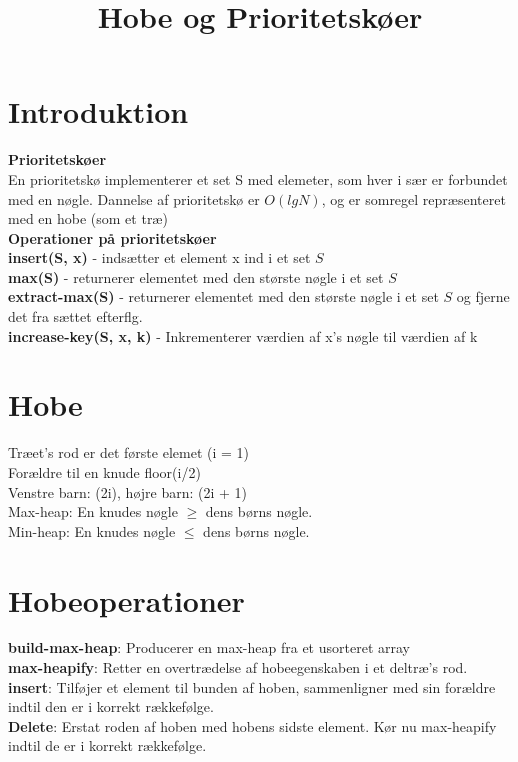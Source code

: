 \documentclass[]{article}
\begin{document}
\title{Hobe og Prioritetskøer}
\maketitle
{\setlength{\parindent}{0 cm}

\section*{Introduktion}

\textbf{Prioritetskøer}\\

En prioritetskø implementerer et set S med elemeter, som hver i sær er forbundet med en nøgle. Dannelse af prioritetskø er $O(lgN)$, og er somregel repræsenteret med en hobe (som et træ)\\

\textbf{Operationer på prioritetskøer} \\

\textbf{insert(S, x)} - indsætter et element x ind i et set $S$\\
\textbf{max(S)} - returnerer elementet med den største nøgle i et set $S$\\
\textbf{extract-max(S)} - returnerer elementet med den største nøgle i et set $S$ og fjerne det fra sættet efterflg.\\
\textbf{increase-key(S, x, k)} - Inkrementerer værdien af x's nøgle til værdien af k

\section*{Hobe}

Træet's rod er det første elemet (i = 1)\\
Forældre til en knude floor(i/2)\\
Venstre barn: (2i), højre barn: (2i + 1)\\
Max-heap: En knudes nøgle $\ge$ dens børns nøgle.\\
Min-heap: En knudes nøgle $\le$ dens børns nøgle.\\

\section*{Hobeoperationer}

\textbf{build-max-heap}: Producerer en max-heap fra et usorteret array\\
\textbf{max-heapify}: Retter en overtrædelse af hobeegenskaben i et deltræ's rod.\\
\textbf{insert}: Tilføjer et element til bunden af hoben, sammenligner med sin forældre indtil den er i korrekt rækkefølge.\\
\textbf{Delete}: Erstat roden af hoben med hobens sidste element. Kør nu max-heapify indtil de er i korrekt rækkefølge.

}
\end{document}
